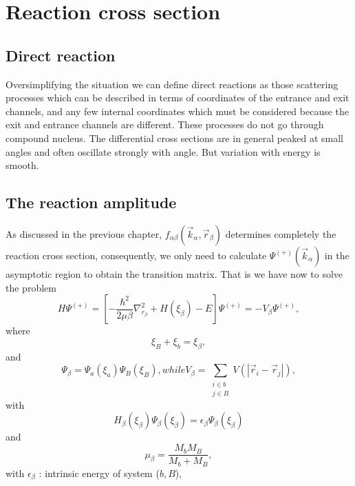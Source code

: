 \chapter{Reaction cross section}
\section{Direct reaction}
Oversimplifying the situation we can define direct reactions as those scattering processes which can be described in terms of coordinates of the entrance and exit channels, and any few internal coordinates which must be considered because the exit and entrance channels are different. These processes do not go through compound nucleus. The differential cross sections are in general peaked at small angles and often oscillate strongly with angle. But variation with energy is smooth. 
\section{The reaction amplitude}
As discussed in the previous chapter, $f_{\alpha \beta}(\vec{k}_\alpha, \vec{r}_\beta)$ determines completely the reaction cross section, consequently, we only need to calculate $\Psi^{(+)}(\vec{k}_\alpha)$ in the asymptotic region to obtain the transition matrix. That is we have now to solve the problem
\begin{equation}\label{eq1}
 H\Psi^{(+)}=\left[ -\frac{\hbar^2}{2\mu \beta} \nabla^2_{r_ \beta}+ H(\xi_\beta)-E\right] \Psi^{(+)}=-V_\beta \Psi^{(+)},
\end{equation}
where
\begin{equation}\label{eq2}
\xi_B+\xi_b=\xi_\beta,
\end{equation}
and
\begin{subequations}
 \begin{equation}\label{eq3a}
\Psi_ \beta=\Psi_ a(\xi_a)\Psi_ B(\xi_B),
\end{equation}
while
\begin{equation}\label{eq3b}
V_\beta=\sum_{\substack{i\in b \\ j\in B}} V(|\vec{r}_i-\vec{r}_j|),
\end{equation}
\end{subequations}
with
\begin{equation}\label{eq4}
H_\beta(\xi_\beta)\Psi_ \beta(\xi_\beta)=\epsilon_ \beta\Psi_ \beta(\xi_\beta)
\end{equation}
and
\begin{equation}\label{eq5}
\mu_\beta=\frac{M_b M_B}{M_b+M_B},
\end{equation}
with
$\epsilon_ \beta$ : intrinsic energy of system ($b,B$),


